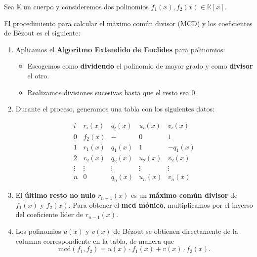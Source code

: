\documentclass[a4paper,12pt]{article}
\begin{document}
\begin{procedimiento}[title=Cálculo del MCD y Coeficientes de Bézout]
Sea \(\mathbb{K}\) un cuerpo y consideremos dos polinomios \(f_1(x), f_2(x) \in \mathbb{K}[x]\).

El procedimiento para calcular el máximo común divisor (MCD) y los coeficientes de Bézout es el siguiente:

\begin{enumerate}
  \item Aplicamos el \textbf{Algoritmo Extendido de Euclides} para polinomios:
  \begin{itemize}
    \item Escogemos como \textbf{dividendo} el polinomio de mayor grado y como \textbf{divisor} el otro.
    \item Realizamos divisiones sucesivas hasta que el resto sea 0.
  \end{itemize}

  \item Durante el proceso, generamos una tabla con los siguientes datos:

\[
\begin{array}{c|c|c|c|c}
i & r_i(x) & q_i(x) & u_i(x) & v_i(x) \\
\hline
0 & f_2(x) & - & 0 & 1 \\
1 & r_1(x) & q_1(x) & 1 & -q_1(x) \\
2 & r_2(x) & q_2(x) & u_2(x) & v_2(x) \\
\vdots & \vdots & \vdots & \vdots & \vdots \\
n & 0 & q_n(x) & u_n(x) & v_n(x)
\end{array}
\]

  \item El \textbf{último resto no nulo} \(r_{n-1}(x)\) es un \textbf{máximo común divisor} de \(f_1(x)\) y \(f_2(x)\).  
  Para obtener el \textbf{mcd mónico}, multiplicamos por el inverso del coeficiente líder de \(r_{n-1}(x)\).

  \item Los polinomios \(u(x)\) y \(v(x)\) de Bézout se obtienen directamente de la columna correspondiente en la tabla, de manera que
  \[
  \text{mcd}(f_1,f_2) = u(x) \cdot f_1(x) + v(x) \cdot f_2(x).
  \]
\end{enumerate}
\end{procedimiento}
\end{document}
